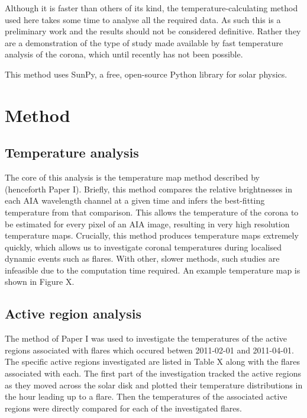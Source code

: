 \documentclass{article}
\begin{document}
Although it is faster than others of its kind, the temperature-calculating method used here takes some time to analyse all the required data.
As such this is a preliminary work and the results should not be considered definitive.
Rather they are a demonstration of the type of study made available by fast temperature analysis of the corona, which until recently has not been possible.

This method uses SunPy, a free, open-source Python library for solar physics.

\section{Method}
\subsection{Temperature analysis}
The core of this analysis is the temperature map method described by \cite{Leonard2014} (henceforth Paper I).
Briefly, this method compares the relative brightnesses in each AIA wavelength channel at a given time and infers the best-fitting temperature from that comparison.
This allows the temperature of the corona to be estimated for every pixel of an AIA image, resulting in very high resolution temperature maps.
Crucially, this method produces temperature maps extremely quickly, which allows us to investigate coronal temperatures during localised dynamic events such as flares.
With other, slower methods, such studies are infeasible due to the computation time required.
An example temperature map is shown in Figure X. %

\subsection{Active region analysis}
The method of Paper I was used to investigate the temperatures of the active regions associated with flares which occured betwen 2011-02-01 and 2011-04-01.
The specific active regions investigated are listed in Table X along with the flares associated with each. %
The first part of the investigation tracked the active regions as they moved across the solar disk and plotted their temperature distributions in the hour leading up to a flare.
Then the temperatures of the associated active regions were directly compared for each of the investigated flares.
\end{document}
